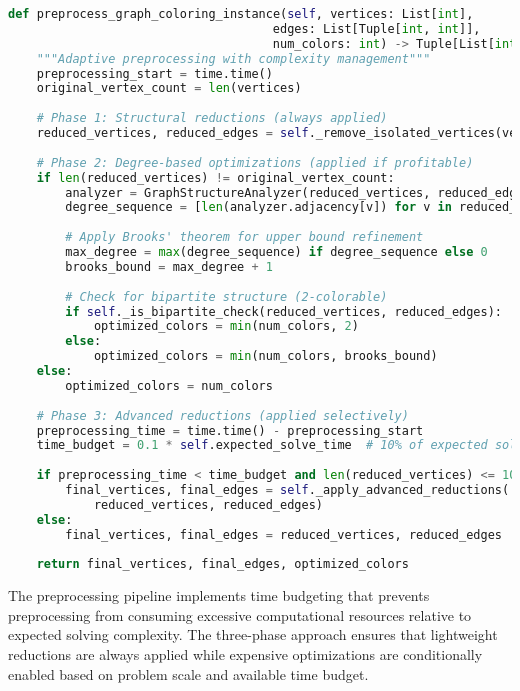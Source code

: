 \begin{lstlisting}[language=Python, caption=Adaptive Preprocessing Pipeline]
def preprocess_graph_coloring_instance(self, vertices: List[int], 
                                     edges: List[Tuple[int, int]], 
                                     num_colors: int) -> Tuple[List[int], List[Tuple[int, int]], int]:
    """Adaptive preprocessing with complexity management"""
    preprocessing_start = time.time()
    original_vertex_count = len(vertices)
    
    # Phase 1: Structural reductions (always applied)
    reduced_vertices, reduced_edges = self._remove_isolated_vertices(vertices, edges)
    
    # Phase 2: Degree-based optimizations (applied if profitable)
    if len(reduced_vertices) != original_vertex_count:
        analyzer = GraphStructureAnalyzer(reduced_vertices, reduced_edges)
        degree_sequence = [len(analyzer.adjacency[v]) for v in reduced_vertices]
        
        # Apply Brooks' theorem for upper bound refinement
        max_degree = max(degree_sequence) if degree_sequence else 0
        brooks_bound = max_degree + 1
        
        # Check for bipartite structure (2-colorable)
        if self._is_bipartite_check(reduced_vertices, reduced_edges):
            optimized_colors = min(num_colors, 2)
        else:
            optimized_colors = min(num_colors, brooks_bound)
    else:
        optimized_colors = num_colors
    
    # Phase 3: Advanced reductions (applied selectively)
    preprocessing_time = time.time() - preprocessing_start
    time_budget = 0.1 * self.expected_solve_time  # 10% of expected solve time
    
    if preprocessing_time < time_budget and len(reduced_vertices) <= 100:
        final_vertices, final_edges = self._apply_advanced_reductions(
            reduced_vertices, reduced_edges)
    else:
        final_vertices, final_edges = reduced_vertices, reduced_edges
    
    return final_vertices, final_edges, optimized_colors
\end{lstlisting}

The preprocessing pipeline implements time budgeting that prevents preprocessing from consuming excessive computational resources relative to expected solving complexity. The three-phase approach ensures that lightweight reductions are always applied while expensive optimizations are conditionally enabled based on problem scale and available time budget.

